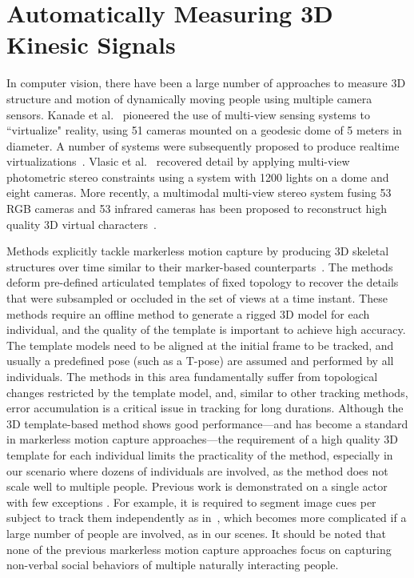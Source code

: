 \section{Automatically Measuring 3D Kinesic Signals}

In computer vision, there have been a large number of approaches to measure 3D structure and motion of dynamically moving people using multiple camera sensors. Kanade et al.~\cite{Kanade-1997} pioneered the use of multi-view sensing systems to ``virtualize" reality, using 51 cameras mounted on a geodesic dome of 5 meters in diameter. A number of systems were subsequently proposed to produce realtime virtualizations~\cite{Matusik-2000,Matsuyama-2002,Gross-2003,Petit-2009}. Vlasic et al.~\cite{Vlasic-2009} recovered detail by applying multi-view photometric stereo constraints using a system with 1200 lights on a dome and eight cameras. More recently, a multimodal multi-view stereo system fusing 53 RGB cameras and 53 infrared cameras has been proposed to reconstruct high quality 3D virtual characters~\cite{Collet-15}. 

Methods explicitly tackle markerless motion capture by producing 3D skeletal structures over time similar to their marker-based counterparts~\cite{Gall-09, Gavrila-96, Cheung-05,Plankers-03, Bregler-04, Kehl-06, Corazza-10, Vlasic-08, Brox-10, Stoll-11, deAguiar-2008, Vlasic-2008, Furukawa-2008}. The methods deform pre-defined articulated templates of fixed topology to recover the details that were subsampled or occluded in the set of views at a time instant. These methods require an offline method to generate a rigged 3D model for each individual, and the quality of the template is important to achieve high accuracy. The template models need to be aligned at the initial frame to be tracked, and usually a predefined pose (such as a T-pose) are assumed and performed by all individuals. The methods in this area fundamentally suffer from topological changes restricted by the template model, and, similar to other tracking methods, error accumulation is a critical issue in tracking for long durations. Although the 3D template-based method shows good performance---and has become a standard in markerless motion capture approaches---the requirement of a high quality 3D template for each individual limits the practicality of the method, especially in our scenario where dozens of individuals are involved, as the method does not scale well to multiple people. Previous work is demonstrated on a single actor with few exceptions \cite{Ye-2012, Liu-2013}. For example, it is required to segment image cues per subject to track them independently as in~\cite{Liu-2013}, which becomes more complicated if a large number of people are involved, as in our scenes. It should be noted that none of the previous markerless motion capture approaches focus on capturing non-verbal social behaviors of multiple naturally interacting people.




